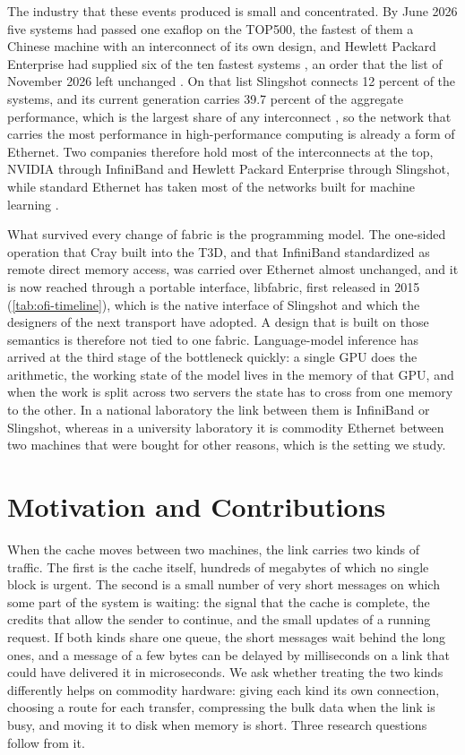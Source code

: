 The industry that these events produced is small and concentrated. By June
2026 five systems had passed one
exaflop on the TOP500, the fastest of them a Chinese machine with an
interconnect of its own design, and Hewlett Packard Enterprise had supplied
six of the ten fastest systems \citep{top500june2026}, an order that the
list of November 2026 left unchanged \citep{sdx2026top500}. On that list
Slingshot connects 12 percent of the systems, and its current generation
carries 39.7 percent of the aggregate performance, which is the largest share
of any interconnect \citep{sdx2026top500}, so the network that carries the most performance in
high-performance computing is already a form of Ethernet. Two companies
therefore hold most of the interconnects at the top, NVIDIA through
InfiniBand and Hewlett Packard Enterprise through Slingshot, while standard
Ethernet has taken most of the networks built for machine learning
\citep{delloro2026ethernet}.

What survived every change of fabric is the programming model. The one-sided
operation that Cray built into the T3D, and that InfiniBand standardized as
remote direct memory access, was carried over Ethernet almost unchanged, and
it is now reached through a portable interface, libfabric, first released
in 2015 (\cref{tab:ofi-timeline}), which is the native interface of
Slingshot and which the designers of the next transport have adopted. A design that is
built on those semantics is therefore not tied to one fabric. Language-model
inference has arrived at the third stage of the bottleneck quickly: a single
GPU does the arithmetic, the working state of the model lives in the memory
of that GPU, and when the work is split across two servers the state has to
cross from one memory to the other. In a national laboratory the link between them is InfiniBand or Slingshot,
whereas in a university laboratory it is commodity Ethernet between two
machines that were bought for other reasons, which is the setting we study.

\section{Motivation and Contributions}
\label{sec:contributions}

When the cache moves between two machines, the link carries two kinds of
traffic. The first is the cache itself, hundreds of megabytes of which no
single block is urgent. The second is a small number of very short messages
on which some part of the system is waiting: the signal that the cache is
complete, the credits that allow the sender to continue, and the small
updates of a running request. If both kinds share one queue, the short
messages wait behind the long ones, and a message of a few bytes can be
delayed by milliseconds on a link that could have delivered it in
microseconds. We ask whether treating the two kinds differently helps on
commodity hardware: giving each kind its own connection, choosing a route for
each transfer, compressing the bulk data when the link is busy, and moving it to disk when memory is short. Three research questions
follow from it.

